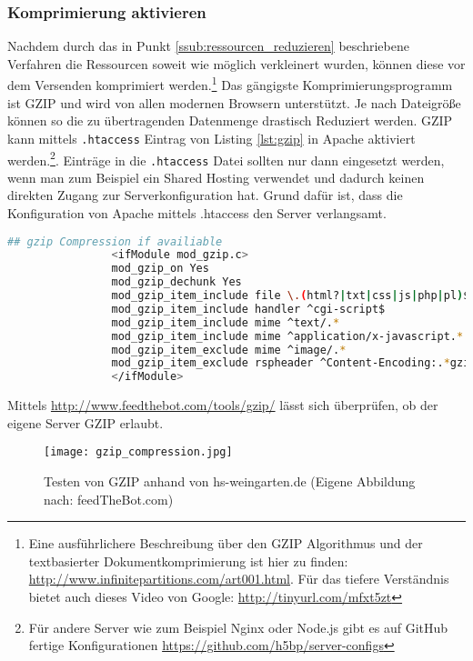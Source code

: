 		\subsubsection{Komprimierung aktivieren} %
		\label{ssub:komprimierung_aktivieren}
			Nachdem durch das in Punkt \ref{ssub:ressourcen_reduzieren} beschriebene Verfahren die Ressourcen soweit wie möglich verkleinert wurden, können diese vor dem Versenden komprimiert werden.\footnote{Eine ausführlichere Beschreibung über den GZIP Algorithmus und der textbasierter Dokumentkomprimierung ist hier zu finden: \url{http://www.infinitepartitions.com/art001.html}. Für das tiefere Verständnis bietet auch dieses Video von Google: \url{http://tinyurl.com/mfxt5zt}} Das gängigste Komprimierungsprogramm ist GZIP und wird von allen modernen Browsern unterstützt. Je nach Dateigröße können so die zu übertragenden Datenmenge drastisch Reduziert werden. GZIP kann mittels \texttt{.htaccess} Eintrag von Listing \ref{lst:gzip} in Apache aktiviert werden.\footnote{Für andere Server wie zum Beispiel Nginx oder Node.js gibt es auf GitHub fertige Konfigurationen \url{https://github.com/h5bp/server-configs}}. Einträge in die \texttt{.htaccess} Datei sollten nur dann eingesetzt werden, wenn man zum Beispiel ein Shared Hosting verwendet und dadurch keinen direkten Zugang zur Serverkonfiguration hat. Grund dafür ist, dass die Konfiguration von Apache mittels .htaccess den Server verlangsamt.\autocite{apache}

			\begin{lstlisting}[captionpos=b, caption=gzip, label=lst:gzip, language=bash]
				## gzip Compression if availiable
				<ifModule mod_gzip.c>
				mod_gzip_on Yes
				mod_gzip_dechunk Yes
				mod_gzip_item_include file \.(html?|txt|css|js|php|pl)$
				mod_gzip_item_include handler ^cgi-script$
				mod_gzip_item_include mime ^text/.*
				mod_gzip_item_include mime ^application/x-javascript.*
				mod_gzip_item_exclude mime ^image/.*
				mod_gzip_item_exclude rspheader ^Content-Encoding:.*gzip.*
				</ifModule>
			\end{lstlisting}

			Mittels \url{http://www.feedthebot.com/tools/gzip/} lässt sich überprüfen, ob der eigene Server GZIP erlaubt.

			\begin{figure}[htbp]
				\begin{center}
					\texttt{[image: gzip\_compression.jpg]}
					\caption{Testen von GZIP anhand von hs-weingarten.de (Eigene Abbildung nach: feedTheBot.com)}
					\label{fig:gzip_compression}
				\end{center}
			\end{figure}
			
